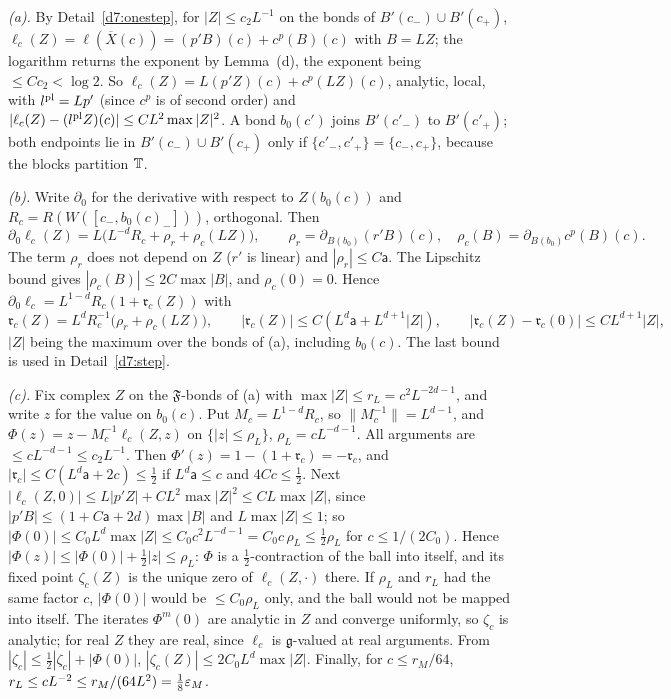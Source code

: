 \begin{detail}\label{d7:elim}
\begin{step}
\emph{(a).} By Detail~\ref{d7:onestep}, for $|Z|\le c_2L^{-1}$ on the bonds of $B'(c_-)\cup B'(c_+)$, $\ell_c(Z)=\ell(\overline X(c))=(p'B)(c)+c^p(B)(c)$ with $B=LZ$; the logarithm returns the exponent by Lemma~(d), the exponent being $\le C c_2<\log2$. So $\ell_c(Z)=L(p'Z)(c)+c^p(LZ)(c)$, analytic, local, with $l^{\rm pl}=Lp'$ (since $c^p$ is of second order) and $|\ell_c(Z)-(l^{\rm pl}Z)(c)|\le CL^2\max|Z|^2$. A bond $b_0(c')$ joins $B'(c'_-)$ to $B'(c'_+)$; both endpoints lie in $B'(c_-)\cup B'(c_+)$ only if $\{c'_-,c'_+\}=\{c_-,c_+\}$, because the blocks partition $\mathbb T$.
\end{step}
\begin{step}
\emph{(b).} Write $\partial_0$ for the derivative with respect to $Z(b_0(c))$ and $R_c=R(W([c_-,b_0(c)_-]))$, orthogonal. Then
\[
\partial_0\ell_c(Z)=L\Big(L^{-d}R_c+\rho_r+\rho_c(LZ)\Big),\qquad\rho_r=\partial_{B(b_0)}(r'B)(c),\quad\rho_c(B)=\partial_{B(b_0)}c^p(B)(c).
\]
The term $\rho_r$ does not depend on $Z$ ($r'$ is linear) and $|\rho_r|\le C\mathsf a$. The Lipschitz bound gives $|\rho_c(B)|\le2C\max|B|$, and $\rho_c(0)=0$. Hence $\partial_0\ell_c=L^{1-d}R_c(1+\mathfrak r_c(Z))$ with
\[
\mathfrak r_c(Z)=L^dR_c^{-1}\big(\rho_r+\rho_c(LZ)\big),\qquad|\mathfrak r_c(Z)|\le C(L^d\mathsf a+L^{d+1}|Z|),\qquad|\mathfrak r_c(Z)-\mathfrak r_c(0)|\le CL^{d+1}|Z|,
\]
$|Z|$ being the maximum over the bonds of (a), including $b_0(c)$. The last bound is used in Detail~\ref{d7:step}.
\end{step}
\begin{step}
\emph{(c).} Fix complex $Z$ on the $\mathfrak F$-bonds of (a) with $\max|Z|\le r_L=c^2L^{-2d-1}$, and write $z$ for the value on $b_0(c)$. Put $M_c=L^{1-d}R_c$, so $\|M_c^{-1}\|=L^{d-1}$, and $\Phi(z)=z-M_c^{-1}\ell_c(Z,z)$ on $\{|z|\le\rho_L\}$, $\rho_L=cL^{-d-1}$. All arguments are $\le cL^{-d-1}\le c_2L^{-1}$. Then $\Phi'(z)=1-(1+\mathfrak r_c)=-\mathfrak r_c$, and $|\mathfrak r_c|\le C(L^d\mathsf a+2c)\le\frac12$ if $L^d\mathsf a\le c$ and $4Cc\le\frac12$. Next $|\ell_c(Z,0)|\le L|p'Z|+CL^2\max|Z|^2\le CL\max|Z|$, since $|p'B|\le(1+C\mathsf a+2d)\max|B|$ and $L\max|Z|\le1$; so $|\Phi(0)|\le C_0L^d\max|Z|\le C_0c^2L^{-d-1}=C_0c\,\rho_L\le\frac12\rho_L$ for $c\le1/(2C_0)$. Hence $|\Phi(z)|\le|\Phi(0)|+\frac12|z|\le\rho_L$: $\Phi$ is a $\frac12$-contraction of the ball into itself, and its fixed point $\zeta_c(Z)$ is the unique zero of $\ell_c(Z,\cdot)$ there. If $\rho_L$ and $r_L$ had the same factor $c$, $|\Phi(0)|$ would be $\le C_0\rho_L$ only, and the ball would not be mapped into itself. The iterates $\Phi^m(0)$ are analytic in $Z$ and converge uniformly, so $\zeta_c$ is analytic; for real $Z$ they are real, since $\ell_c$ is $\mathfrak g$-valued at real arguments. From $|\zeta_c|\le\frac12|\zeta_c|+|\Phi(0)|$, $|\zeta_c(Z)|\le2C_0L^d\max|Z|$. Finally, for $c\le r_M/64$, $r_L\le cL^{-2}\le r_M/(64L^2)=\frac18\varepsilon_M$.

\end{step}
\end{detail}

